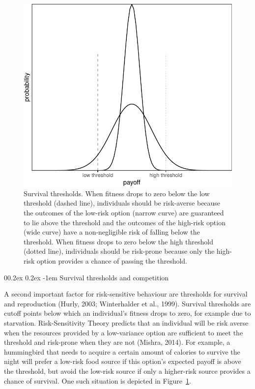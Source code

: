 \documentclass[
  ,man,mask,floatsintext]{apa6}
\makeatletter
\let\oldparagraph\paragraph
\renewcommand{\paragraph}[1]{\oldparagraph{#1}\mbox{}}
\renewcommand{\paragraph}{\@startsection{paragraph}{4}{\parindent}%
  {0\baselineskip \@plus 0.2ex \@minus 0.2ex}%
  {-1em}%
  {\normalfont\normalsize\bfseries\itshape\typesectitle}}
\makeatother
\begin{document}
\begin{figure}

{\centering \includegraphics[width=0.6\linewidth]{rr-risk-sensitivity_files/figure-latex/varianceplot-1} 

}

\caption{Survival thresholds. When fitness drops to zero below the low threshold (dashed line), individuals should be risk-averse because the outcomes of the low-risk option (narrow curve) are guaranteed to lie above the threshold and the outcomes of the high-risk option (wide curve) have a non-negligible risk of falling below the threshold. When fitness drops to zero below the high threshold (dotted line), individuals should be risk-prone because only the high-risk option provides a chance of passing the threshold.}\label{fig:varianceplot}
\end{figure}

\hypertarget{survival-thresholds-and-competition}{%
\paragraph{Survival thresholds and competition}\label{survival-thresholds-and-competition}}

A second important factor for risk-sensitive behaviour are thresholds for survival and reproduction (Hurly, 2003; Winterhalder et al., 1999).
Survival thresholds are cutoff points below which an individual's fitness drops to zero, for example due to starvation.
Risk-Sensitivity Theory predicts that an individual will be risk averse when the resources provided by a low-variance option are sufficient to meet the threshold and risk-prone when they are not (Mishra, 2014).
For example, a hummingbird that needs to acquire a certain amount of calories to survive the night will prefer a low-risk food source if this option's expected payoff is above the threshold, but avoid the low-risk source if only a higher-risk source provides a chance of survival.
One such situation is depicted in Figure~\ref{fig:varianceplot}.
\end{document}
